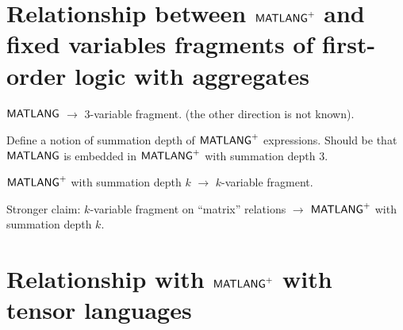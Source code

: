 \section{Relationship between $\mathsf{MATLANG}^{\sf +}$ and fixed variables fragments of first-order logic with aggregates}
$\mathsf{MATLANG}$ $\to$ 3-variable fragment. (the other direction is not known).

Define a notion of summation depth of $\mathsf{MATLANG}^{\sf +}$ expressions. Should be that $\mathsf{MATLANG}$ is embedded in $\mathsf{MATLANG}^{\sf +}$ with summation depth $3$. 

$\mathsf{MATLANG}^{\sf +}$ with summation depth $k$ $\to$ $k$-variable fragment.

Stronger claim: $k$-variable fragment on ``matrix'' relations $\to$ $\mathsf{MATLANG}^{\sf +}$ with summation depth $k$.

\section{Relationship with $\mathsf{MATLANG}^{\sf +}$ with tensor languages}



%
%		


%
%







